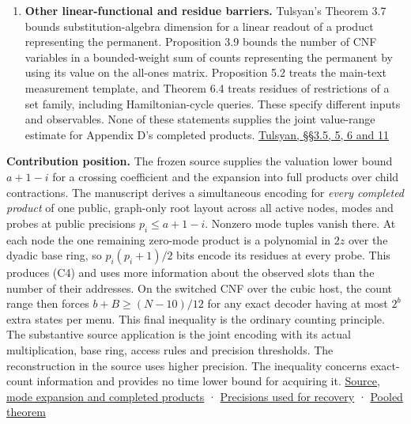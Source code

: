 \documentclass[11pt,a4paper]{article}
\begin{document}
\begin{enumerate}
  Definition 5.1 assumes rational Hermite recovery for every polynomial
  through a specified degree. Section 5.1 explicitly explains why
  tapered modular recovery in Appendix D falls outside that model.
  Theorems 8.1 and 8.3 charge specified clause-product evaluation costs.
  Their Proposition 4.1 and Appendix B.1 \emph{do} examine Appendix D's
  prescribed higher root precision and estimate the certified
  running-time bound from mode tuple enumeration. Counting tuple indices
  at that precision does not control how many different menus of reduced
  slot \emph{values} varying inputs can produce.
  \href{https://arxiv.org/html/2611.00517v1}{Dias and Lima, §§4--5, 8
  and Appendix B.1}
\item
  \textbf{Other linear-functional and residue barriers.} Tulsyan's
  Theorem 3.7 bounds substitution-algebra dimension for a linear readout
  of a product representing the permanent. Proposition 3.9 bounds the
  number of CNF variables in a bounded-weight sum of counts representing
  the permanent by using its value on the all-ones matrix. Proposition
  5.2 treats the main-text measurement template, and Theorem 6.4 treats
  residues of restrictions of a set family, including Hamiltonian-cycle
  queries. These specify different inputs and observables. None of these
  statements supplies the joint value-range estimate for Appendix D's
  completed products.
  \href{https://hexagonmath.org/pdf/2611.00149v1}{Tulsyan, §§3.5, 5, 6
  and 11}
\end{enumerate}

\textbf{Contribution position.} The frozen source supplies the valuation
lower bound \(a+1-i\) for a crossing coefficient and the expansion into
full products over child contractions. The manuscript derives a
simultaneous encoding for \emph{every completed product} of one public,
graph-only root layout across all active nodes, modes and probes at
public precisions \(p_i\le a+1-i\). Nonzero mode tuples vanish there. At
each node the one remaining zero-mode product is a polynomial in \(2z\)
over the dyadic base ring, so \(p_i(p_i+1)/2\) bits encode its residues
at every probe. This produces (C4) and uses more information about the
observed slots than the number of their addresses. On the switched CNF
over the cubic host, the count range then forces \(b+B\ge(N-10)/12\) for
any exact decoder having at most \(2^b\) extra states per menu. This
final inequality is the ordinary counting principle. The substantive
source application is the joint encoding with its actual multiplication,
base ring, access rules and precision thresholds. The reconstruction in
the source uses higher precision. The inequality concerns exact-count
information and provides no time lower bound for acquiring it.
\href{https://github.com/openai/math/blob/main/preprints/The-Exponential-Time-Hypothesis-is-False-October-25-2026/build/quantitative-contraction.tex\#L385-L523}{Source,
mode expansion and completed products} ·
\href{https://github.com/openai/math/blob/main/preprints/The-Exponential-Time-Hypothesis-is-False-October-25-2026/build/quantitative-contraction.tex\#L338}{Precisions
used for recovery} · \hyperref[v8-section-pooled-menu-barrier]{Pooled
theorem}
\end{document}
